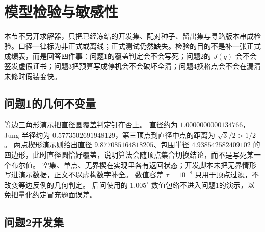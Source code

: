 \section{模型检验与敏感性}

本节不另开求解器，只把已经冻结的开发集、配对种子、留出集与寻路版本串成检验。口径一律标为非正式或离线；正式测试仍然缺失。检验的目的不是补一张正式成绩表，而是回答四件事：问题1的覆盖判定会不会写死；问题2的 $J(q)$ 会不会签发虚假证书；问题3把预算写成停机会不会破坏全清；问题4换格点会不会在漏清未修时假装变快。

\subsection{问题1的几何不变量}

等边三角形演示把直径圆覆盖判定钉在否上。
直径约为 $1.0000000000134766$，Jung 半径约为 $0.5773502691948129$，第三顶点到直径中点的距离为 $\sqrt{3}/2>1/2$。
两点楔形演示则给出直径 $9.877085164818205$、包围半径 $4.938542582409102$ 的四边形，此时直径圆恰好覆盖，说明算法会随顶点集合切换结论，而不是写死某一个布尔值。
空集、单点、无界楔在实现里各有返回状态；开发脚本未把无界情形写进演示数据，正文不以虚构数字补全。
数值容差 $\tau=10^{-8}$ 只用于顶点过滤，不改变等边反例的几何判定。
后问使用的 $1.005^\circ$ 数值包络不进入问题1的演示，以免把量化约定冒充题面误差。

\subsection{问题2开发集}


